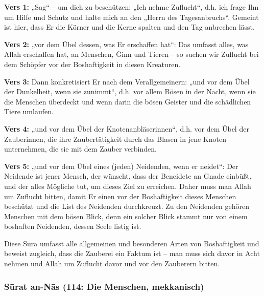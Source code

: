 \textbf{Vers 1:} „Sag“ – um dich zu beschützen: „Ich nehme Zuflucht“, d.h. ich frage Ihn um Hilfe
und Schutz und halte mich an den „Herrn des Tagesanbruchs“. Gemeint ist hier, dass Er die
Körner und die Kerne spalten und den Tag anbrechen lässt.

\textbf{Vers 2:} „vor dem Übel dessen, was Er erschaffen hat“: Das umfasst alles, was Allah
erschaffen hat, an Menschen, Ǧinn und Tieren – so suchen wir Zuflucht bei dem Schöpfer vor der
Boshaftigkeit in diesen Kreaturen.

\textbf{Vers 3:} Dann konkretisiert Er nach dem Verallgemeinern: „und vor dem Übel der
Dunkelheit, wenn sie zunimmt“, d.h. vor allem Bösen in der Nacht, wenn sie die Menschen
überdeckt und wenn darin die bösen Geister und die schädlichen Tiere umlaufen.

\textbf{Vers 4:} „und vor dem Übel der Knotenanbläserinnen“, d.h. vor dem Übel der Zauberinnen,
die ihre Zaubertätigkeit durch das Blasen in jene Knoten unternehmen, die sie mit dem Zauber
verbinden.

\textbf{Vers 5:} „und vor dem Übel eines (jeden) Neidenden, wenn er neidet“: Der Neidende ist
jener Mensch, der wünscht, dass der Beneidete an Gnade einbüßt, und der alles Mögliche tut, um
dieses Ziel zu erreichen. Daher muss man Allah um Zuflucht bitten, damit Er einen vor der
Boshaftigkeit dieses Menschen beschützt und die List des Neidenden durchkreuzt. Zu den
Neidenden gehören Menschen mit dem bösen Blick, denn ein solcher Blick stammt nur von
einem boshaften Neidenden, dessen Seele listig ist.

\begin{merke}
Diese Sūra umfasst alle allgemeinen und besonderen Arten von Boshaftigkeit und beweist
zugleich, dass die Zauberei ein Faktum ist – man muss sich davor in Acht nehmen und Allah um
Zuflucht davor und vor den Zauberern bitten.
\end{merke}

\subsubsection*{Sūrat an-Nās (114: Die Menschen, mekkanisch)}

